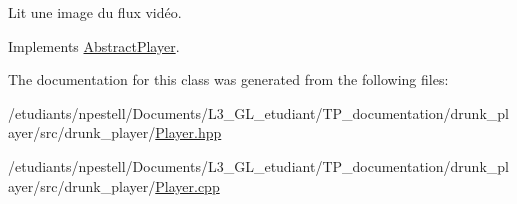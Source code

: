 Lit une image du flux vidéo. 



Implements \hyperlink{classAbstractPlayer_a5c9a863c96224dd297aa44c69010cd94}{Abstract\+Player}.



The documentation for this class was generated from the following files\+:\begin{DoxyCompactItemize}
\item 
/etudiants/npestell/\+Documents/\+L3\+\_\+\+G\+L\+\_\+etudiant/\+T\+P\+\_\+documentation/drunk\+\_\+player/src/drunk\+\_\+player/\hyperlink{Player_8hpp}{Player.\+hpp}\item 
/etudiants/npestell/\+Documents/\+L3\+\_\+\+G\+L\+\_\+etudiant/\+T\+P\+\_\+documentation/drunk\+\_\+player/src/drunk\+\_\+player/\hyperlink{Player_8cpp}{Player.\+cpp}\end{DoxyCompactItemize}
